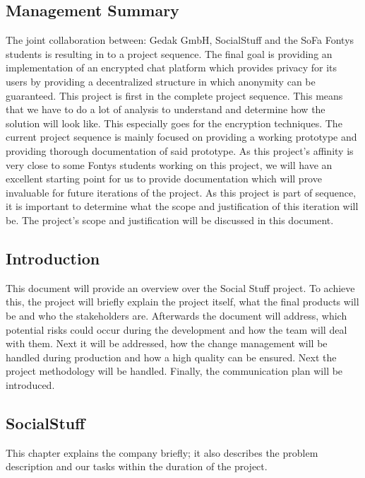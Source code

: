 \subsection{Management Summary}\label{subsec:management-summary}

The joint collaboration between: Gedak GmbH, SocialStuff and the SoFa Fontys students is resulting in to a project
sequence.
The final goal is providing an implementation of an encrypted chat platform which provides privacy for its users by
providing a decentralized structure in which anonymity can be guaranteed.
This project is first in the complete project sequence.
This means that we have to do a lot of analysis to understand and determine how the solution will look like.
This especially goes for the encryption techniques.
The current project sequence is mainly focused on providing a working prototype and providing thorough documentation
of said prototype.
As this project’s affinity is very close to some Fontys students working on this project, we will have an
excellent starting point for us to provide documentation which will prove invaluable for future iterations of the
project.
As this project is part of sequence, it is important to determine what the scope and justification of this iteration
will be.
The project's scope and justification will be discussed in this document.

\subsection{Introduction}\label{subsec:introduction}
This document will provide an overview over the Social Stuff project.
To achieve this, the project will briefly explain the project itself, what the final products will be and who the
stakeholders are.
Afterwards the document will address, which potential risks could occur during the development and how the team will
deal with them.
Next it will be addressed, how the change management will be handled during production and how a high quality can be
ensured.
Next the project methodology will be handled.
Finally, the communication plan will be introduced.

\subsection{SocialStuff}\label{subsec:socialstuff}

This chapter explains the company briefly;
it also describes the problem description and our tasks within the duration of the project.

